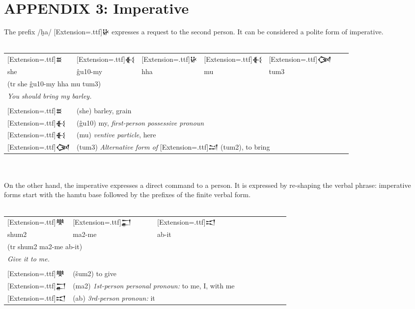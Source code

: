 \documentclass[a4paper,12pt]{book}
\newcommand{\fcn}{\setmainfont{Akkadian}[Extension=.ttf]}
\newcommand{\fsm}{\Large\setmainfont{Akkadian}[Extension=.ttf]}
\begin{document}
\chapter*{APPENDIX 3: Imperative}

The prefix /ḫa/ {\fcn 𒄩} expresses a request
to the second person. It can be considered
a polite form of imperative.\\

\verb||\\
\begin{tabular}[!h]{l l l l l l l}
\fsm 𒊺 &\fsm 𒈬 &\fsm 𒄩 &\fsm 𒈬 &\fsm 𒉐\\
she     & ĝu10-my & hha & mu & tum3\\
\multicolumn{5}{l}{(tr she ĝu10-my hha mu tum3)}\\
\multicolumn{5}{l}{\em You should bring my barley.}\\
\hline\\
\fsm 𒊺 &\multicolumn{4}{l}{(she) barley, grain}\\
\fsm 𒈬 &\multicolumn{4}{l}{(ĝu10) my,
  {\em first-person possessive pronoun}}\\
\fsm 𒈬 &\multicolumn{4}{l}{(mu) {\em ventive particle}, here }\\
\fsm 𒉐 &
\multicolumn{4}{l}{(tum3) {\em Alternative form of} {\fcn 𒁺} (tum2),
  to bring }\\
\end{tabular}\verb||\\

\verb||\\
On the other hand, the imperative expresses
a direct command to a person. It is expressed
by re-shaping the verbal phrase: imperative
forms start with the hamtu base followed by
the prefixes of the finite verbal form.\\

\verb||\\
\begin{tabular}[!h]{l l l l l l l l l l}
  \fsm  𒋧 &\fsm 𒂷&\fsm 𒀊\\
  shum2    & ma2-me & ab-it\\
  \multicolumn{3}{l}{(tr shum2 ma2-me ab-it)}\\
  \multicolumn{3}{l}{\em Give it to me.}\\
  \hline\\
  \fsm 𒋧  &\multicolumn{2}{l}{(šum2) to give}\\
  \fsm 𒂷
  &\multicolumn{2}{l}{(ma2)
    {\em 1st-person personal pronoun:}
    to me, I, with me}\\
  \fsm 𒀊  &\multicolumn{2}{l}{(ab) {\em 3rd-person pronoun:} it}\\
\end{tabular}
\end{document}
